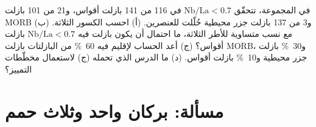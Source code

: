\begin{exercise}[$\star\star\star$]\label{exo:b2:magmatic-series:12}
في المجموعة، تتحقّق $\mathrm{Nb}/\mathrm{La} < 0.7$ في 116 من 141 بازلت أقواس،
و21 من 101 بازلت MORB و3 من 137 بازلت جزر محيطية حُلّلت للعنصرين. (أ) احسب
الكسور الثلاثة. (ب) مع نسب متساوية للأطر الثلاثة، ما
احتمال أن يكون بازلت فيه $\mathrm{Nb}/\mathrm{La} < 0.7$ بازلت أقواس؟ (ج)
أعد الحساب لإقليم فيه \qty{60}{\percent} من البازلتات بازلت MORB، و\qty{30}{\percent}
بازلت جزر محيطية و\qty{10}{\percent} بازلت أقواس. (د) ما الدرس الذي تحمله (ج)
لاستعمال مخطّطات التمييز؟
\end{exercise}

\section{مسألة: بركان واحد وثلاث حمم}

